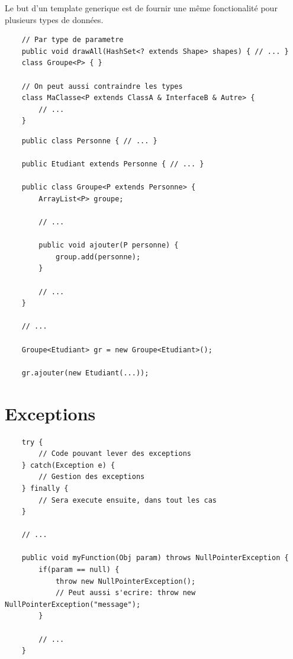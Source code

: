 \documentclass[a4paper, 12pt, french]{article}
\begin{document}
	Le but d'un template generique est de fournir une même fonctionalité pour plusieurs types de données.

	\begin{lstlisting}
	// Par type de parametre
	public void drawAll(HashSet<? extends Shape> shapes) { // ... }
	class Groupe<P> { }

	// On peut aussi contraindre les types
	class MaClasse<P extends ClassA & InterfaceB & Autre> {
		// ...
	}
	\end{lstlisting}

	\begin{lstlisting}
	public class Personne { // ... }

	public Etudiant extends Personne { // ... }

	public class Groupe<P extends Personne> {
		ArrayList<P> groupe;

		// ...

		public void ajouter(P personne) {
			group.add(personne);
		}

		// ...
	}

	// ...

	Groupe<Etudiant> gr = new Groupe<Etudiant>();

	gr.ajouter(new Etudiant(...));
	\end{lstlisting}

	\section{Exceptions}

	\begin{lstlisting}
	try {
		// Code pouvant lever des exceptions
	} catch(Exception e) {
		// Gestion des exceptions
	} finally {
		// Sera execute ensuite, dans tout les cas
	}

	// ...

	public void myFunction(Obj param) throws NullPointerException {
		if(param == null) {
			throw new NullPointerException();
			// Peut aussi s'ecrire: throw new NullPointerException("message");
		}

		// ...
	}
	\end{lstlisting}
\end{document}
